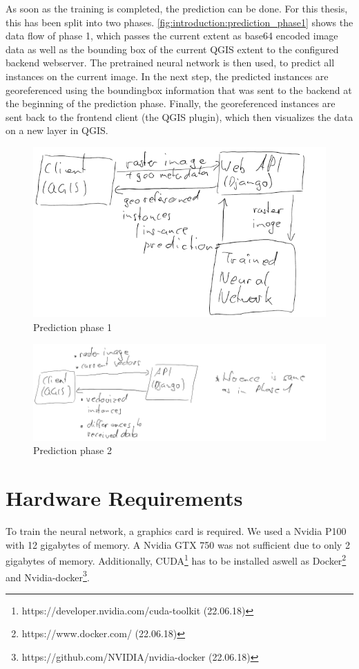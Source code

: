 As soon as the training is completed, the prediction can be done. For this thesis, this has been split into two phases. \autoref{fig:introduction:prediction_phase1} shows the data flow of phase 1, which passes the current extent as base64 encoded image data as well as the bounding box of the current QGIS extent to the configured backend webserver. The pretrained neural network is then used, to predict all instances on the current image. In the next step, the predicted instances are georeferenced using the boundingbox information that was sent to the backend at the beginning of the prediction phase. Finally, the georeferenced instances are sent back to the frontend client (the QGIS plugin), which then visualizes the data on a new layer in QGIS.

\begin{figure}[H]
    \centering
	\includegraphics[width=0.9\linewidth]{chapters/introduction/images/inference_phase1.png}
	\caption{Prediction phase 1}
	\label{fig:introduction:prediction_phase1}
\end{figure}

\begin{figure}[H]
    \centering
	\includegraphics[width=0.9\linewidth]{chapters/introduction/images/inference_phase2.png}
	\caption{Prediction phase 2}
	\label{fig:introduction:prediction_phase2}
\end{figure}

\section{Hardware Requirements}
To train the neural network, a graphics card is required. We used a Nvidia P100 with 12 gigabytes of memory. A Nvidia GTX 750 was not sufficient due to only 2 gigabytes of memory. Additionally, CUDA\footnote{https://developer.nvidia.com/cuda-toolkit (22.06.18)} has to be installed aswell as Docker\footnote{https://www.docker.com/ (22.06.18)} and Nvidia-docker\footnote{https://github.com/NVIDIA/nvidia-docker (22.06.18)}.

